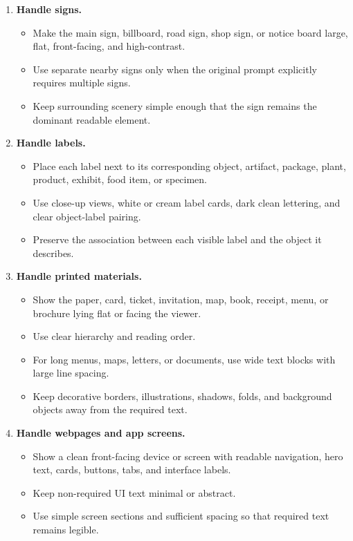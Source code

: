 \documentclass{llmxive}
\begin{document}
\begin{tcolorbox}
\begin{enumerate}[leftmargin=1.5em, itemsep=0.2em, topsep=0.2em, parsep=0pt, partopsep=0pt]
    \item \textbf{Handle signs.}
    \begin{itemize}[leftmargin=1.5em, itemsep=0pt, topsep=0pt, parsep=0pt, partopsep=0pt]
        \item Make the main sign, billboard, road sign, shop sign, or notice board large, flat, front-facing, and high-contrast.
        \item Use separate nearby signs only when the original prompt explicitly requires multiple signs.
        \item Keep surrounding scenery simple enough that the sign remains the dominant readable element.
    \end{itemize}

    \item \textbf{Handle labels.}
    \begin{itemize}[leftmargin=1.5em, itemsep=0pt, topsep=0pt, parsep=0pt, partopsep=0pt]
        \item Place each label next to its corresponding object, artifact, package, plant, product, exhibit, food item, or specimen.
        \item Use close-up views, white or cream label cards, dark clean lettering, and clear object-label pairing.
        \item Preserve the association between each visible label and the object it describes.
    \end{itemize}

    \item \textbf{Handle printed materials.}
    \begin{itemize}[leftmargin=1.5em, itemsep=0pt, topsep=0pt, parsep=0pt, partopsep=0pt]
        \item Show the paper, card, ticket, invitation, map, book, receipt, menu, or brochure lying flat or facing the viewer.
        \item Use clear hierarchy and reading order.
        \item For long menus, maps, letters, or documents, use wide text blocks with large line spacing.
        \item Keep decorative borders, illustrations, shadows, folds, and background objects away from the required text.
    \end{itemize}

    \item \textbf{Handle webpages and app screens.}
    \begin{itemize}[leftmargin=1.5em, itemsep=0pt, topsep=0pt, parsep=0pt, partopsep=0pt]
        \item Show a clean front-facing device or screen with readable navigation, hero text, cards, buttons, tabs, and interface labels.
        \item Keep non-required UI text minimal or abstract.
        \item Use simple screen sections and sufficient spacing so that required text remains legible.
    \end{itemize}


\end{enumerate}
\end{tcolorbox}
\end{document}
